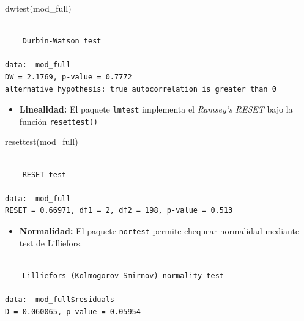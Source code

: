 \documentclass[
  spanish,
  a4paper,
]{scrbook}
\newenvironment{Shaded}{\begin{snugshade}}{\end{snugshade}}
\newcommand{\FunctionTok}[1]{\textcolor[rgb]{0.28,0.35,0.67}{#1}}
\newcommand{\NormalTok}[1]{\textcolor[rgb]{0.00,0.23,0.31}{#1}}
\newcommand{\SpecialCharTok}[1]{\textcolor[rgb]{0.37,0.37,0.37}{#1}}
\providecommand{\tightlist}{%
  \setlength{\itemsep}{0pt}\setlength{\parskip}{0pt}}
\begin{document}
\begin{Shaded}
\begin{Highlighting}[]
\FunctionTok{dwtest}\NormalTok{(mod\_full)}
\end{Highlighting}
\end{Shaded}

\begin{verbatim}

    Durbin-Watson test

data:  mod_full
DW = 2.1769, p-value = 0.7772
alternative hypothesis: true autocorrelation is greater than 0
\end{verbatim}

\begin{itemize}
\tightlist
\item
  \textbf{Linealidad:} El paquete \texttt{lmtest} implementa el
  \emph{Ramsey's RESET} bajo la función \texttt{resettest()}
\end{itemize}

\begin{Shaded}
\begin{Highlighting}[]
\FunctionTok{resettest}\NormalTok{(mod\_full)}
\end{Highlighting}
\end{Shaded}

\begin{verbatim}

    RESET test

data:  mod_full
RESET = 0.66971, df1 = 2, df2 = 198, p-value = 0.513
\end{verbatim}

\begin{itemize}
\tightlist
\item
  \textbf{Normalidad:} El paquete \texttt{nortest} permite chequear
  normalidad mediante test de Lilliefors.
\end{itemize}

\begin{Shaded}
\end{Shaded}

\begin{verbatim}

    Lilliefors (Kolmogorov-Smirnov) normality test

data:  mod_full$residuals
D = 0.060065, p-value = 0.05954
\end{verbatim}
\end{document}
